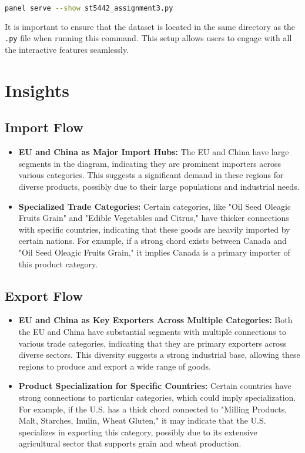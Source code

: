 \documentclass{article}
\begin{document}
\begin{lstlisting}[language=bash]
panel serve --show st5442_assignment3.py
\end{lstlisting}

It is important to ensure that the dataset is located in the same directory as the \texttt{.py} file when running this command. This setup allows users to engage with all the interactive features seamlessly.

\section{Insights}

\subsection{Import Flow}

\begin{itemize}
    \item \textbf{EU and China as Major Import Hubs:} The EU and China have large segments in the diagram, indicating they are prominent importers across various categories. This suggests a significant demand in these regions for diverse products, possibly due to their large populations and industrial needs.
    
    \item \textbf{Specialized Trade Categories:} Certain categories, like "Oil Seed Oleagic Fruits Grain" and "Edible Vegetables and Citrus," have thicker connections with specific countries, indicating that these goods are heavily imported by certain nations. For example, if a strong chord exists between Canada and "Oil Seed Oleagic Fruits Grain," it implies Canada is a primary importer of this product category.
\end{itemize}

\subsection{Export Flow}

\begin{itemize}
    \item \textbf{EU and China as Key Exporters Across Multiple Categories:} Both the EU and China have substantial segments with multiple connections to various trade categories, indicating that they are primary exporters across diverse sectors. This diversity suggests a strong industrial base, allowing these regions to produce and export a wide range of goods.
    
    \item \textbf{Product Specialization for Specific Countries:} Certain countries have strong connections to particular categories, which could imply specialization. For example, if the U.S. has a thick chord connected to "Milling Products, Malt, Starches, Inulin, Wheat Gluten," it may indicate that the U.S. specializes in exporting this category, possibly due to its extensive agricultural sector that supports grain and wheat production.
\end{itemize}
\end{document}
